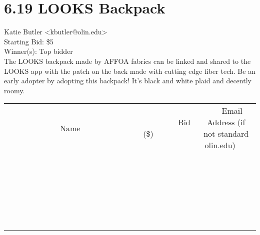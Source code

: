\documentclass[11pt]{article}
\begin{document}
					\section*{6.19 LOOKS Backpack}
					Katie Butler <kbutler@olin.edu> \\
					Starting Bid: \$5 \\
					Winner(s): Top bidder \\
					The LOOKS backpack made by AFFOA fabrics can be linked and shared to the LOOKS app with the patch on the back made with cutting edge fiber tech. Be an early adopter by adopting this backpack! It's black and white plaid and decently roomy. \\
					[6ex]
					\begin{tabular}{c c c}
						~~~~~~~~~~~~~Name~~~~~~~~~~~~~ & ~~~~~~~~~Bid (\$)~~~~~~~~~ & ~~~Email Address (if not standard olin.edu)~~~ \\
				
 & & \\
\hline
 & & \\
\hline
 & & \\
\hline
 & & \\
\hline
 & & \\
\hline
 & & \\
\hline
 & & \\
\hline
 & & \\
\hline
 & & \\
\hline
 & & \\
\hline
 & & \\
\hline
 & & \\
\hline
 & & \\
\hline
 & & \\
\hline
 & & \\
\hline
 & & \\
\hline
 & & \\
\hline
 & & \\
\hline
 & & \\
\hline
 & & \\
\hline
 & & \\
\hline
 & & \\
\hline
 & & \\
\hline
 & & \\
\hline
 & & \\
\hline
 & & \\
\hline
					\end{tabular}
					\clearpage
				
\end{document}
